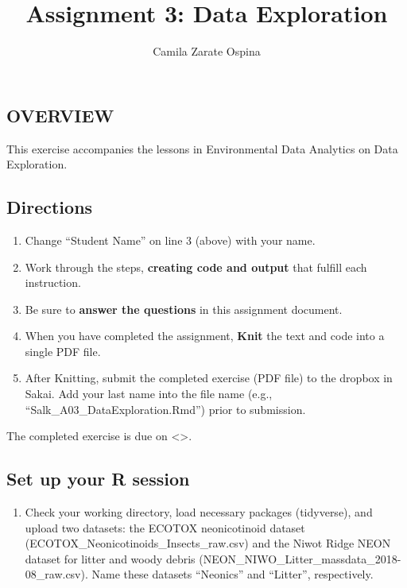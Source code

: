 \documentclass[
]{article}
\title{Assignment 3: Data Exploration}
\author{Camila Zarate Ospina}
\date{}
\providecommand{\tightlist}{%
  \setlength{\itemsep}{0pt}\setlength{\parskip}{0pt}}
\begin{document}
\maketitle

\hypertarget{overview}{%
\subsection{OVERVIEW}\label{overview}}

This exercise accompanies the lessons in Environmental Data Analytics on
Data Exploration.

\hypertarget{directions}{%
\subsection{Directions}\label{directions}}

\begin{enumerate}
\def\labelenumi{\arabic{enumi}.}
\tightlist
\item
  Change ``Student Name'' on line 3 (above) with your name.
\item
  Work through the steps, \textbf{creating code and output} that fulfill
  each instruction.
\item
  Be sure to \textbf{answer the questions} in this assignment document.
\item
  When you have completed the assignment, \textbf{Knit} the text and
  code into a single PDF file.
\item
  After Knitting, submit the completed exercise (PDF file) to the
  dropbox in Sakai. Add your last name into the file name (e.g.,
  ``Salk\_A03\_DataExploration.Rmd'') prior to submission.
\end{enumerate}

The completed exercise is due on \textless\textgreater.

\hypertarget{set-up-your-r-session}{%
\subsection{Set up your R session}\label{set-up-your-r-session}}

\begin{enumerate}
\def\labelenumi{\arabic{enumi}.}
\tightlist
\item
  Check your working directory, load necessary packages (tidyverse), and
  upload two datasets: the ECOTOX neonicotinoid dataset
  (ECOTOX\_Neonicotinoids\_Insects\_raw.csv) and the Niwot Ridge NEON
  dataset for litter and woody debris
  (NEON\_NIWO\_Litter\_massdata\_2018-08\_raw.csv). Name these datasets
  ``Neonics'' and ``Litter'', respectively.
\end{enumerate}
\end{document}
